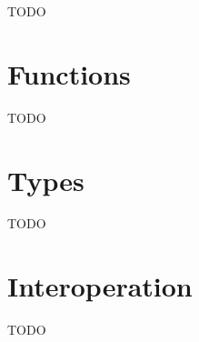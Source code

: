 TODO

\section{Functions}

TODO

\section{Types}

TODO

\section{Interoperation}

TODO

\clearpage



\clearpage



\clearpage



\clearpage



\clearpage



\clearpage



\clearpage



\clearpage



\clearpage



\clearpage



\clearpage



\clearpage



\clearpage



\clearpage



\clearpage



\clearpage



